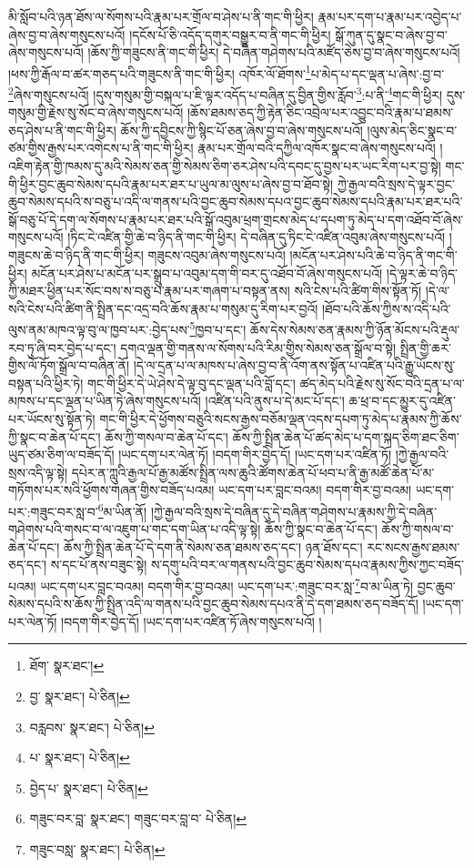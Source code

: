 མི་སློབ་པའི་ཉན་ཐོས་ལ་སོགས་པའི་རྣམ་པར་གྲོལ་བ་ཤེས་པ་ནི་གང་གི་ཕྱིར། རྣམ་པར་དག་པ་རྣམ་པར་འབྱེད་པ་ཞེས་བྱ་བ་ཞེས་གསུངས་པའོ། །དངོས་པོ་ཅི་འདོད་དགུར་བསྒྱུར་བ་ནི་གང་གི་ཕྱིར། སྒོ་ཀུན་དུ་སྣང་བ་ཞེས་བྱ་བ་ཞེས་གསུངས་པའོ། །ཆོས་ཀྱི་གཟུངས་ནི་གང་གི་ཕྱིར། དེ་བཞིན་གཤེགས་པའི་མཛོད་ཅེས་བྱ་བ་ཞེས་གསུངས་པའོ། །ཕས་ཀྱི་རྒོལ་བ་ཚར་གཅད་པའི་གཟུངས་ནི་གང་གི་ཕྱིར། འཁོར་ལོ་ཐོགས་\footnote{ཐོག་  སྣར་ཐང་། }པ་མེད་པ་དང་ལྡན་པ་ཞེས་:བྱ་བ་\footnote{བྱ་  སྣར་ཐང་།  པེ་ཅིན། }ཞེས་གསུངས་པའོ། །དུས་གསུམ་གྱི་བསྐལ་པ་ཇི་ལྟར་འདོད་པ་བཞིན་དུ་བྱིན་གྱིས་རློབ་\footnote{བརླབས་  སྣར་ཐང་།  པེ་ཅིན། }:པ་ནི་\footnote{པ་  སྣར་ཐང་།  པེ་ཅིན། }གང་གི་ཕྱིར། དུས་གསུམ་གྱི་རྗེས་སུ་སོང་བ་ཞེས་གསུངས་པའོ། །ཆོས་ཐམས་ཅད་ཀྱི་རྟེན་ཅིང་འབྲེལ་པར་འབྱུང་བའི་རྣམ་པ་ཐམས་ཅད་ཤེས་པ་ནི་གང་གི་ཕྱིར། ཆོས་ཀྱི་དབྱིངས་ཀྱི་སྙིང་པོ་ཅན་ཞེས་བྱ་བ་ཞེས་གསུངས་པའོ། །ལུས་མེད་ཅིང་སྣང་བ་ཙམ་གྱིས་རྒྱས་པར་འགེངས་པ་ནི་གང་གི་ཕྱིར། རྣམ་པར་གྲོལ་བའི་དཀྱིལ་འཁོར་སྣང་བ་ཞེས་གསུངས་པའོ། །འཇིག་རྟེན་གྱི་ཁམས་དུ་མའི་སེམས་ཅན་གྱི་སེམས་ཅིག་ཅར་ཤེས་པའི་དབང་དུ་བྱས་པར་ཡང་རིག་པར་བྱ་སྟེ། གང་གི་ཕྱིར་བྱང་ཆུབ་སེམས་དཔའི་རྣམ་པར་ཐར་པ་ཡུལ་མ་ལུས་པ་ཞེས་བྱ་བ་ཐོབ་སྟེ། ཀྱེ་རྒྱལ་བའི་སྲས་དེ་ལྟར་བྱང་ཆུབ་སེམས་དཔའི་ས་བཅུ་པ་འདི་ལ་གནས་པའི་བྱང་ཆུབ་སེམས་དཔའ་བྱང་ཆུབ་སེམས་དཔའི་རྣམ་པར་ཐར་པའི་སྒོ་བཅུ་པོ་དེ་དག་ལ་སོགས་པ་རྣམ་པར་ཐར་པའི་སྒོ་འབུམ་ཕྲག་གྲངས་མེད་པ་དཔག་ཏུ་མེད་པ་དག་འཐོབ་བོ་ཞེས་གསུངས་པའོ། །ཏིང་ངེ་འཛིན་གྱི་ཆེ་བ་ཉིད་ནི་གང་གི་ཕྱིར། དེ་བཞིན་དུ་ཏིང་ངེ་འཛིན་འབུམ་ཞེས་གསུངས་པའོ། །གཟུངས་ཆེ་བ་ཉིད་ནི་གང་གི་ཕྱིར། གཟུངས་འབུམ་ཞེས་གསུངས་པའོ། །མངོན་པར་ཤེས་པའི་ཆེ་བ་ཉིད་ནི་གང་གི་ཕྱིར། མངོན་པར་ཤེས་པ་མངོན་པར་སྒྲུབ་པ་འབུམ་དག་གི་བར་དུ་འཐོབ་བོ་ཞེས་གསུངས་པའོ། །དེ་ལྟར་ཆེ་བ་ཉིད་ཀྱི་མཐར་ཕྱིན་པར་སོང་བས་ས་བཅུ་པ་རྣམ་པར་གཞག་པ་བསྟན་ནས། སའི་ངེས་པའི་ཚིག་གིས་སྟོན་ཏོ། །དེ་ལ་སའི་ངེས་པའི་ཚིག་ནི་སྤྲིན་དང་འདྲ་བའི་ཆོས་རྣམ་པ་གསུམ་དུ་རིག་པར་བྱའོ། །ཐོབ་པའི་ཆོས་ཀྱིས་ས་འདི་པའི་ལུས་ནམ་མཁའ་ལྟ་བུ་ལ་ཁྱབ་པར་:བྱེད་པས་\footnote{བྱེད་པ་  སྣར་ཐང་།  པེ་ཅིན། }ཁྱབ་པ་དང་། ཆོས་དེས་སེམས་ཅན་རྣམས་ཀྱི་ཉོན་མོངས་པའི་རྡུལ་རབ་ཏུ་ཞི་བར་བྱེད་པ་དང་། དགའ་ལྡན་གྱི་གནས་ལ་སོགས་པའི་རིམ་གྱིས་སེམས་ཅན་སྒྲོལ་བ་སྟེ། སྤྲིན་གྱི་ཆར་གྱིས་ལོ་ཏོག་སྒྲོལ་བ་བཞིན་ནོ། །དེ་ལ་དྲན་པ་ལ་མཁས་པ་ཞེས་བྱ་བ་ནི་འོག་ནས་སྟོན་པ་འཛིན་པའི་རྒྱུ་ཡོངས་སུ་བསྟན་པའི་ཕྱིར་ཏེ། གང་གི་ཕྱིར་དེ་ཡེ་ཤེས་དེ་ལྟ་བུ་དང་ལྡན་པའི་བློ་དང་། ཚད་མེད་པའི་རྗེས་སུ་སོང་བའི་དྲན་པ་ལ་མཁས་པ་དང་ལྡན་པ་ཡིན་ཏེ་ཞེས་གསུངས་པའོ། །འཛིན་པའི་ནུས་པ་དེ་མང་པོ་དང་། ཆ་ཕྲ་བ་དང་མྱུར་དུ་འཛིན་པར་ཡོངས་སུ་སྟོན་ཏེ། གང་གི་ཕྱིར་དེ་ཕྱོགས་བཅུའི་སངས་རྒྱས་བཅོམ་ལྡན་འདས་དཔག་ཏུ་མེད་པ་རྣམས་ཀྱི་ཆོས་ཀྱི་སྣང་བ་ཆེན་པོ་དང་། ཆོས་ཀྱི་གསལ་བ་ཆེན་པོ་དང་། ཆོས་ཀྱི་སྤྲིན་ཆེན་པོ་ཚད་མེད་པ་དག་སྐད་ཅིག་ཐང་ཅིག་ཡུད་ཙམ་ཅིག་ལ་བཟོད་དོ། །ཡང་དག་པར་ལེན་ཏོ། །བདག་གིར་བྱེད་དོ། །ཡང་དག་པར་འཛིན་ཏོ། །ཀྱེ་རྒྱལ་བའི་སྲས་འདི་ལྟ་སྟེ། དཔེར་ན་ཀླུའི་རྒྱལ་པོ་རྒྱ་མཚོས་སྤྲིན་ལས་ཆུའི་ཚོགས་ཆེན་པོ་ཕབ་པ་ནི་རྒྱ་མཚོ་ཆེན་པོ་མ་གཏོགས་པར་སའི་ཕྱོགས་གཞན་གྱིས་བཟོད་པའམ། ཡང་དག་པར་བླང་བའམ། བདག་གིར་བྱ་བའམ། ཡང་དག་པར་:གཟུང་བར་སླ་བ་\footnote{གཟུང་བར་བླ་  སྣར་ཐང་། གཟུང་བར་བླ་བ་  པེ་ཅིན། }མ་ཡིན་ནོ། །ཀྱེ་རྒྱལ་བའི་སྲས་དེ་བཞིན་དུ་དེ་བཞིན་གཤེགས་པ་རྣམས་ཀྱི་དེ་བཞིན་གཤེགས་པའི་གསང་བ་ལ་འཇུག་པ་གང་དག་ཡིན་པ་འདི་ལྟ་སྟེ། ཆོས་ཀྱི་སྣང་བ་ཆེན་པོ་དང་། ཆོས་ཀྱི་གསལ་བ་ཆེན་པོ་དང་། ཆོས་ཀྱི་སྤྲིན་ཆེན་པོ་དེ་དག་ནི་སེམས་ཅན་ཐམས་ཅད་དང་། ཉན་ཐོས་དང་། རང་སངས་རྒྱས་ཐམས་ཅད་དང་། ས་དང་པོ་ནས་བཟུང་སྟེ། ས་དགུ་པའི་བར་ལ་གནས་པའི་བྱང་ཆུབ་སེམས་དཔའ་རྣམས་ཀྱིས་ཀྱང་བཟོད་པའམ། ཡང་དག་པར་བླང་བའམ། བདག་གིར་བྱ་བའམ། ཡང་དག་པར་:གཟུང་བར་སླ་\footnote{གཟུང་བསླ་  སྣར་ཐང་།  པེ་ཅིན། }བ་མ་ཡིན་ཏེ། བྱང་ཆུབ་སེམས་དཔའི་ས་ཆོས་ཀྱི་སྤྲིན་འདི་ལ་གནས་པའི་བྱང་ཆུབ་སེམས་དཔའ་ནི་དེ་དག་ཐམས་ཅད་བཟོད་དོ། །ཡང་དག་པར་ལེན་ཏོ། །བདག་གིར་བྱེད་དོ། །ཡང་དག་པར་འཛིན་ཏོ་ཞེས་གསུངས་པའོ། །
